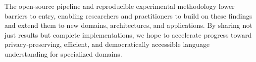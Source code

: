 The open-source pipeline and reproducible experimental methodology lower barriers to entry, enabling researchers and practitioners to build on these findings and extend them to new domains, architectures, and applications. By sharing not just results but complete implementations, we hope to accelerate progress toward privacy-preserving, efficient, and democratically accessible language understanding for specialized domains.
